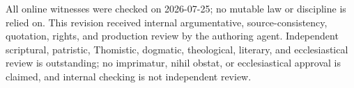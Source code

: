 All online witnesses were checked on 2026-07-25; no mutable law or discipline is relied on. This revision received internal argumentative, source-consistency, quotation, rights, and production review by the authoring agent. Independent scriptural, patristic, Thomistic, dogmatic, theological, literary, and ecclesiastical review is outstanding; no imprimatur, nihil obstat, or ecclesiastical approval is claimed, and internal checking is not independent review.
